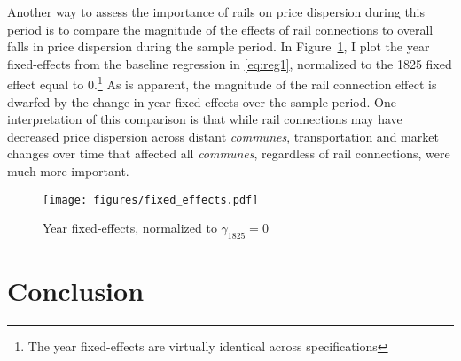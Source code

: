 \documentclass[12pt,twoside]{article}
\begin{document}
Another way to assess the importance of rails on price dispersion during this period is to compare the magnitude of the effects of rail connections to overall falls in price dispersion during the sample period.
In Figure~\ref{fig:fixed_effects}, I plot the year fixed-effects from the baseline regression in \eqref{eq:reg1}, normalized to the 1825 fixed effect equal to 0.\footnote{The year fixed-effects are virtually identical across specifications}
As is apparent, the magnitude of the rail connection effect is dwarfed by the change in year fixed-effects over the sample period.
One interpretation of this comparison is that while rail connections may have decreased price dispersion across distant \emph{communes}, transportation and market changes over time that affected all \emph{communes}, regardless of rail connections, were much more important.

\begin{figure}[ht]
	\centering
	\caption{Year fixed-effects, normalized to $\gamma_{1825} = 0$}
	\texttt{[image: figures/fixed\_effects.pdf]}
	\label{fig:fixed_effects}
\end{figure}

\section{Conclusion}

\newpage


 
\end{document}
